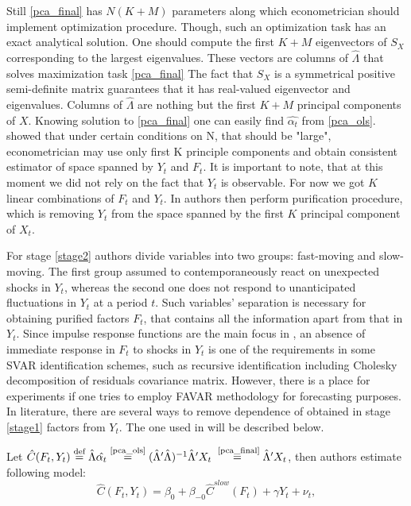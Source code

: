 \documentclass[a4paper, 14pt]{article}
\begin{document}
 Still \eqref{pca_final} has $N(K+M)$ parameters along which econometrician should implement optimization procedure. Though, such an optimization task has an exact analytical solution. One should compute the first $K+M$ eigenvectors of $S_X$ corresponding to the largest eigenvalues. These vectors are columns of $\hat{\Lambda}$ that solves maximization task \eqref{pca_final} The fact that $S_X$ is a symmetrical positive semi-definite matrix guarantees that it has real-valued eigenvector and eigenvalues. Columns of $\hat{\Lambda}$ are nothing but the first $K+M$ principal components of $X$. Knowing solution to \eqref{pca_final} one can easily find $\hat{\alpha_t}$ from \eqref{pca_ols}. \cite{stock2002macroeconomic} showed that under certain conditions on N, that should be "large", econometrician may use only first K principle components and obtain consistent estimator of space spanned by $Y_t$ and $F_t$. It is important to note, that at this moment we did not rely on the fact that $Y_t$ is observable. For now we got $K$ linear combinations of $F_t$ and $Y_t$. In \cite{bernanke2005measuring} authors then perform purification procedure, which is removing $Y_t$ from the space spanned by the first $K$ principal component of $X_t$.
 
 For stage \ref{stage2} authors divide variables into two groups: fast-moving and slow-moving. The first group assumed to contemporaneously react on unexpected shocks in $Y_t$, whereas the second one does not respond to unanticipated fluctuations in $Y_t$ at a period $t$. Such variables' separation is necessary for obtaining purified factors $F_t$, that contains all the information apart from that in $Y_t$. Since impulse response functions are the main focus in \cite{bernanke2005measuring}, an absence of immediate response in $F_t$ to shocks in $Y_t$ is one of the requirements in some SVAR identification schemes, such as recursive identification including Cholesky decomposition of residuals covariance matrix. However, there is a place for experiments if one tries to employ FAVAR methodology for forecasting purposes. In literature, there are several ways to remove dependence of obtained in stage \ref{stage1} factors from $Y_t$. The one used in \cite{bernanke2005measuring} will be described below.
 
 \noindent Let $\hat{C}(F_t, Y_t) \stackrel{\text{def}}{=} \hat{\Lambda} \hat{\alpha_t} \stackrel{\text{\eqref{pca_ols}}}{=} (\hat\Lambda' \hat\Lambda)^{-1}\hat\Lambda'X_t  \stackrel{\text{ \eqref{pca_final}}}{=} \hat\Lambda'X_t$, then authors estimate following model:
 \begin{equation}\label{favar_pure}
 \hat{C}(F_t, Y_t) = \beta_0 + \beta_{-0} \hat{C}^{slow}(F_t) + \gamma Y_t + \nu_t ,
 \end{equation}
 
\end{document}
